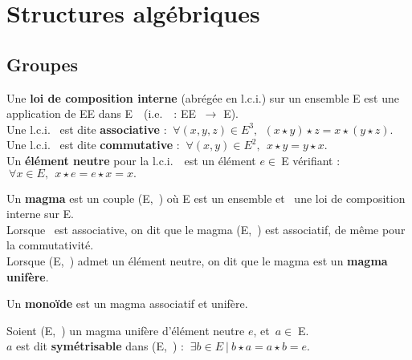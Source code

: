 \section{Structures algébriques}

\vspace{1cm}

\subsection{Groupes}

\vspace{0.7cm}

Une \textbf{loi de composition interne} (abrégée en l.c.i.) sur un ensemble E est une application de E\x E dans E\ \ (i.e.\ \lci\, : E\x E \(\ \to\) E).\vspace{0.1cm} \\
Une l.c.i. \lci \ est dite \textbf{associative} \ssi : \(\ \forall (x,y,z)\in E^3,\ \ (x\star y)\star z = x\star (y\star z).\)\vspace{0.1cm} \\
Une l.c.i. \lci \ est dite \textbf{commutative} \ssi : \(\ \forall (x,y)\in E^2,\ \ x\star y = y\star x\).\vspace{0.1cm} \\
Un \textbf{élément neutre} pour la l.c.i. \lci \ \,est un élément \(e\in \ \)E vérifiant : \(\ \forall x\in E,\ \ x\star e= e\star x = x.\)

\vspace{1cm}

Un \textbf{magma} est un couple (E,\ \lci) où E est un ensemble et \lci \ une loi de composition interne sur E. \\
Lorsque \lci \ est associative, on dit que le magma (E,\ \lci) est associatif, de même pour la commutativité.\vspace{0.1cm} \\
Lorsque (E,\ \lci) admet un élément neutre, on dit que le magma est un \textbf{magma unifère}.

\vspace{1cm}

Un \textbf{monoïde} est un magma associatif et unifère.

\vspace{1cm}

Soient (E,\ \lci) un magma unifère d'élément neutre $e$, et \(\,a \in \; \)E.\\
$a$ est dit \textbf{symétrisable} dans (E,\ \lci) \ssi : \(\ \exists b\in E \ | \ b\star a = a\star b = e.\)

